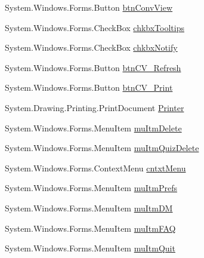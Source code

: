 \begin{DoxyCompactItemize}
\item 
\-System.\-Windows.\-Forms.\-Button \hyperlink{class_sr_p___classroom_inq_1_1frm_classrrom_inq_ab75b7c14e1f4b71b6513122c99dbe532}{btn\-Conv\-View}
\item 
\-System.\-Windows.\-Forms.\-Check\-Box \hyperlink{class_sr_p___classroom_inq_1_1frm_classrrom_inq_a1952935fe5b823dcc597f5aafd7436aa}{chkbx\-Tooltips}
\item 
\-System.\-Windows.\-Forms.\-Check\-Box \hyperlink{class_sr_p___classroom_inq_1_1frm_classrrom_inq_a86f98a8c743985a65d129f24ed240ba6}{chkbx\-Notify}
\item 
\-System.\-Windows.\-Forms.\-Button \hyperlink{class_sr_p___classroom_inq_1_1frm_classrrom_inq_acab3b8f1dd8b8c6298dd2c11aa764a29}{btn\-C\-V\-\_\-\-Refresh}
\item 
\-System.\-Windows.\-Forms.\-Button \hyperlink{class_sr_p___classroom_inq_1_1frm_classrrom_inq_aa974c0ec46e2bca7bea74774e0f460d4}{btn\-C\-V\-\_\-\-Print}
\item 
\-System.\-Drawing.\-Printing.\-Print\-Document \hyperlink{class_sr_p___classroom_inq_1_1frm_classrrom_inq_a27d138482c23d40f494f49984816227e}{\-Printer}
\item 
\-System.\-Windows.\-Forms.\-Menu\-Item \hyperlink{class_sr_p___classroom_inq_1_1frm_classrrom_inq_afb6bae444aa0f2084f3d447454a29e47}{mu\-Itm\-Delete}
\item 
\-System.\-Windows.\-Forms.\-Menu\-Item \hyperlink{class_sr_p___classroom_inq_1_1frm_classrrom_inq_a2d03550cfd9c6e91732a9a669089cb48}{mu\-Itm\-Quiz\-Delete}
\item 
\-System.\-Windows.\-Forms.\-Context\-Menu \hyperlink{class_sr_p___classroom_inq_1_1frm_classrrom_inq_a7fb167457515aba637054c47a301188e}{cntxt\-Menu}
\item 
\-System.\-Windows.\-Forms.\-Menu\-Item \hyperlink{class_sr_p___classroom_inq_1_1frm_classrrom_inq_a13631d0933d2eb8825ef015322073644}{mu\-Itm\-Prefs}
\item 
\-System.\-Windows.\-Forms.\-Menu\-Item \hyperlink{class_sr_p___classroom_inq_1_1frm_classrrom_inq_a1ab66b5e5506390fd7dab2fae510c610}{mu\-Itm\-D\-M}
\item 
\-System.\-Windows.\-Forms.\-Menu\-Item \hyperlink{class_sr_p___classroom_inq_1_1frm_classrrom_inq_aecb074ee2d728e4e88009f9a6f3c4f6d}{mu\-Itm\-F\-A\-Q}
\item 
\-System.\-Windows.\-Forms.\-Menu\-Item \hyperlink{class_sr_p___classroom_inq_1_1frm_classrrom_inq_a139fd89a3fbbc5272712ac921557dd03}{mu\-Itm\-Quit}
\item 

\end{DoxyCompactItemize}
